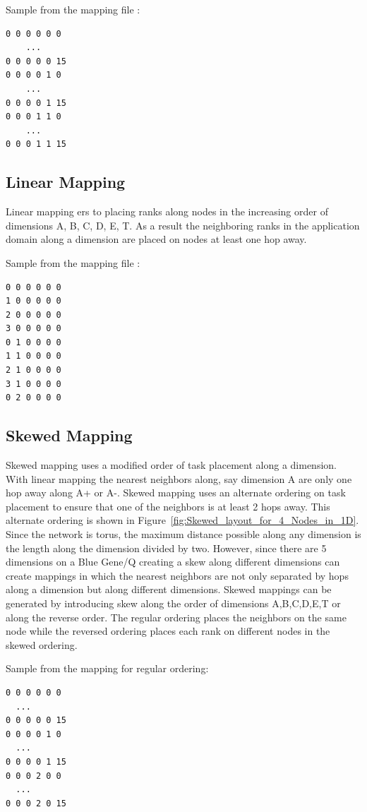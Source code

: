 \documentclass{acm_proc_article-sp}
\begin{document}
Sample from the mapping file :
\begin{lstlisting}[frame=lines, basicstyle=\ttfamily,columns=fixed]
0 0 0 0 0 0
    ...
0 0 0 0 0 15
0 0 0 0 1 0
    ...
0 0 0 0 1 15
0 0 0 1 1 0
    ...
0 0 0 1 1 15
\end{lstlisting}

\subsection{Linear Mapping}
Linear mapping ers to placing ranks along nodes in the increasing order of dimensions A, B, C, D, E, T.
As a result the neighboring ranks in the application domain along a dimension are placed on nodes at least
one hop away.

Sample from the mapping file :
\begin{lstlisting}[frame=lines, basicstyle=\ttfamily,columns=fixed]
0 0 0 0 0 0
1 0 0 0 0 0
2 0 0 0 0 0
3 0 0 0 0 0
0 1 0 0 0 0
1 1 0 0 0 0
2 1 0 0 0 0
3 1 0 0 0 0
0 2 0 0 0 0
\end{lstlisting}

\subsection{Skewed Mapping}

Skewed mapping uses a modified order of task placement along a dimension.
With linear mapping the nearest neighbors along, say dimension A are only one hop away along A+ or A-.
Skewed mapping uses an alternate ordering on task placement to ensure that one of the neighbors is at least
2 hops away. This alternate ordering is shown in Figure~\ref{fig:Skewed_layout_for_4_Nodes_in_1D}.
Since the network is torus, the maximum distance possible along any dimension is the length along
the dimension divided by two. However, since there are 5 dimensions on a Blue Gene/Q creating a skew along different
dimensions can create mappings in which the nearest neighbors are not only separated by hops along a dimension but
along different dimensions. Skewed mappings can be generated by introducing skew along the order of dimensions
A,B,C,D,E,T or along the reverse order. The regular ordering places the neighbors on the same node while the reversed
ordering places each rank on different nodes in the skewed ordering.

Sample from the mapping for regular ordering:
\begin{lstlisting}[frame=lines, basicstyle=\ttfamily,columns=fixed]
0 0 0 0 0 0
  ...
0 0 0 0 0 15
0 0 0 0 1 0
  ...
0 0 0 0 1 15
0 0 0 2 0 0
  ...
0 0 0 2 0 15
\end{lstlisting}
\end{document}
